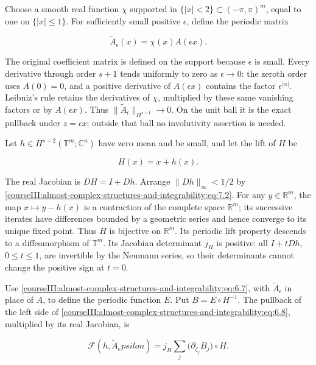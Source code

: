 Choose a smooth real function \(\chi\) supported in \(\{|x|<2\}\subset(-\pi,\pi)^m\), equal to one on \(\{|x|\leq1\}\). For sufficiently small positive \(\epsilon\), define the periodic matrix

\begin{equation}
\widetilde A_\epsilon(x)=\chi(x)A(\epsilon x).
\label{courseIII:almost-complex-structures-and-integrability:eq:7.4}
\end{equation}

The original coefficient matrix is defined on the support because \(\epsilon\) is small. Every derivative through order \(s+1\) tends uniformly to zero as \(\epsilon\to0\): the zeroth order uses \(A(0)=0\), and a positive derivative of \(A(\epsilon x)\) contains the factor \(\epsilon^{|\alpha|}\). Leibniz's rule retains the derivatives of \(\chi\), multiplied by these same vanishing factors or by \(A(\epsilon x)\). Thus
\(\|\widetilde A_\epsilon\|_{H^{s+1}}\to0\).
On the unit ball it is the exact pullback under \(z=\epsilon x\); outside that ball no involutivity assertion is needed.

Let \(h\in H^{s+2}(\mathbb T^m;\mathbb C^n)\) have zero mean and be small, and let the lift of \(H\) be

\begin{equation}
H(x)=x+h(x).
\label{courseIII:almost-complex-structures-and-integrability:eq:7.5}
\end{equation}

The real Jacobian is \(DH=I+Dh\). Arrange \(\|Dh\|_\infty<1/2\) by \eqref{courseIII:almost-complex-structures-and-integrability:eq:7.2}. For any \(y\in\mathbb R^m\), the map \(x\mapsto y-h(x)\) is a contraction of the complete space \(\mathbb R^m\); its successive iterates have differences bounded by a geometric series and hence converge to its unique fixed point. Thus \(H\) is bijective on \(\mathbb R^m\). Its periodic lift property descends to a diffeomorphism of \(\mathbb T^m\). Its Jacobian determinant \(j_H\) is positive: all \(I+tDh\), \(0\leq t\leq1\), are invertible by the Neumann series, so their determinants cannot change the positive sign at \(t=0\).

Use \eqref{courseIII:almost-complex-structures-and-integrability:eq:6.7}, with \(\widetilde A_\epsilon\) in place of \(A\), to define the periodic function \(E\). Put \(B=E\circ H^{-1}\). The pullback of the left side of \eqref{courseIII:almost-complex-structures-and-integrability:eq:6.8}, multiplied by its real Jacobian, is

\begin{equation}
\mathcal F(h,\widetilde A_epsilon)
=j_H\sum_j\bigl(\partial_{\zeta_j}B_j\bigr)\circ H.
\label{courseIII:almost-complex-structures-and-integrability:eq:7.6}
\end{equation}

